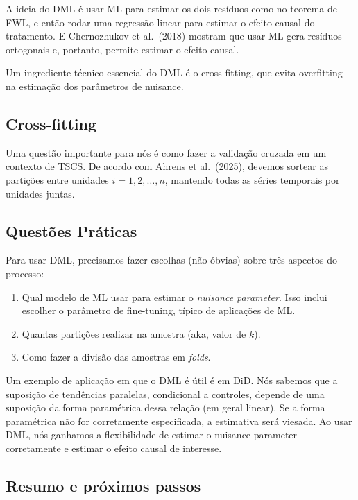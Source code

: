 \documentclass[
]{article}
\begin{document}
A ideia do DML é usar ML para estimar os dois resíduos como no teorema de FWL, e então rodar uma regressão linear para estimar o efeito causal do tratamento. E Chernozhukov et al.~(2018) mostram que usar ML gera resíduos ortogonais e, portanto, permite estimar o efeito causal.

Um ingrediente técnico essencial do DML é o cross-fitting, que evita overfitting na estimação dos parâmetros de nuisance.

\subsection{Cross-fitting}\label{cross-fitting}

Uma questão importante para nós é como fazer a validação cruzada em um contexto de TSCS. De acordo com Ahrens et al.~(2025), devemos sortear as partições entre unidades \(i = 1, 2, \dots, n\), mantendo todas as séries temporais por unidades juntas.

\subsection{Questões Práticas}\label{questuxf5es-pruxe1ticas}

Para usar DML, precisamos fazer escolhas (não-óbvias) sobre três aspectos do processo:

\begin{enumerate}
\def\labelenumi{\arabic{enumi}.}
\item
  Qual modelo de ML usar para estimar o \emph{nuisance parameter}. Isso inclui escolher o parâmetro de fine-tuning, típico de aplicações de ML.
\item
  Quantas partições realizar na amostra (aka, valor de \(k\)).
\item
  Como fazer a divisão das amostras em \emph{folds}.
\end{enumerate}

Um exemplo de aplicação em que o DML é útil é em DiD. Nós sabemos que a suposição de tendências paralelas, condicional a controles, depende de uma suposição da forma paramétrica dessa relação (em geral linear). Se a forma paramétrica não for corretamente especificada, a estimativa será viesada. Ao usar DML, nós ganhamos a flexibilidade de estimar o nuisance parameter corretamente e estimar o efeito causal de interesse.

\subsection{Resumo e próximos passos}\label{resumo-e-pruxf3ximos-passos-5}
\end{document}
